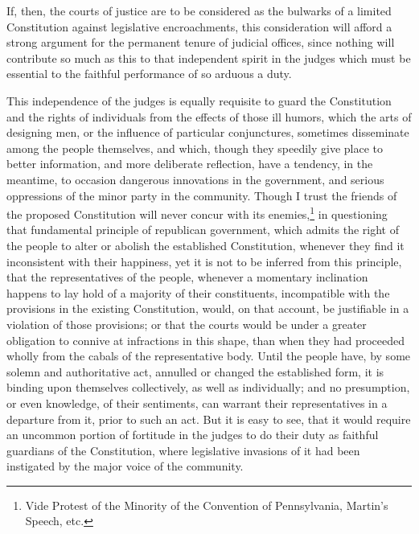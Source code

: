 If, then, the courts of justice are to be considered as the bulwarks of a limited Constitution against legislative encroachments, this consideration will afford a strong argument for the permanent tenure of judicial offices, since nothing will contribute so much as this to that independent spirit in the judges which must be essential to the faithful performance of so arduous a duty.

This independence of the judges is equally requisite to guard the Constitution and the rights of individuals from the effects of those ill humors, which the arts of designing men, or the influence of particular conjunctures, sometimes disseminate among the people themselves, and which, though they speedily give place to better information, and more deliberate reflection, have a tendency, in the meantime, to occasion dangerous innovations in the government, and serious oppressions of the minor party in the community. Though I trust the friends of the proposed Constitution will never concur with its enemies,\footnote{Vide Protest of the Minority of the Convention of Pennsylvania, Martin's Speech, etc.} in questioning that fundamental principle of republican government, which admits the right of the people to alter or abolish the established Constitution, whenever they find it inconsistent with their happiness, yet it is not to be inferred from this principle, that the representatives of the people, whenever a momentary inclination happens to lay hold of a majority of their constituents, incompatible with the provisions in the existing Constitution, would, on that account, be justifiable in a violation of those provisions; or that the courts would be under a greater obligation to connive at infractions in this shape, than when they had proceeded wholly from the cabals of the representative body. Until the people have, by some solemn and authoritative act, annulled or changed the established form, it is binding upon themselves collectively, as well as individually; and no presumption, or even knowledge, of their sentiments, can warrant their representatives in a departure from it, prior to such an act. But it is easy to see, that it would require an uncommon portion of fortitude in the judges to do their duty as faithful guardians of the Constitution, where legislative invasions of it had been instigated by the major voice of the community.

